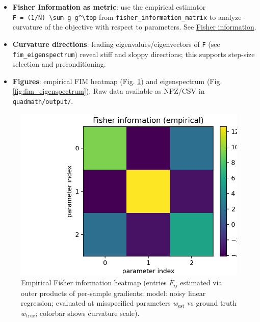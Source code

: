 \documentclass[
]{article}
\providecommand{\tightlist}{%
  \setlength{\itemsep}{0pt}\setlength{\parskip}{0pt}}
\begin{document}
\begin{itemize}
\tightlist
\item
  \textbf{Fisher Information as metric}: use the empirical estimator
  \texttt{F\ =\ (1/N)\ \textbackslash{}sum\ g\ g\^{}\textbackslash{}top}
  from \texttt{fisher\_information\_matrix} to analyze curvature of the
  objective with respect to parameters. See
  \href{https://en.wikipedia.org/wiki/Fisher_information}{Fisher
  information}.
\item
  \textbf{Curvature directions}: leading eigenvalues/eigenvectors of
  \texttt{F} (see \texttt{fim\_eigenspectrum}) reveal stiff and sloppy
  directions; this supports step-size selection and preconditioning.
\item
  \textbf{Figures}: empirical FIM heatmap (Fig.
  \ref{fig:fisher_information_matrix}) and eigenspectrum (Fig.
  \ref{fig:fim_eigenspectrum}). Raw data available as NPZ/CSV in
  \texttt{quadmath/output/}.
\end{itemize}

\begin{figure}
\hypertarget{fig:fisher_information_matrix}{%
\centering
\includegraphics{../output/fisher_information_matrix.png}
\caption{Empirical Fisher information heatmap (entries \(F_{ij}\)
estimated via outer products of per-sample gradients; model: noisy
linear regression; evaluated at misspecified parameters \(w_\text{est}\)
vs ground truth \(w_\text{true}\); colorbar shows curvature
scale).}\label{fig:fisher_information_matrix}
}
\end{figure}
\end{document}
